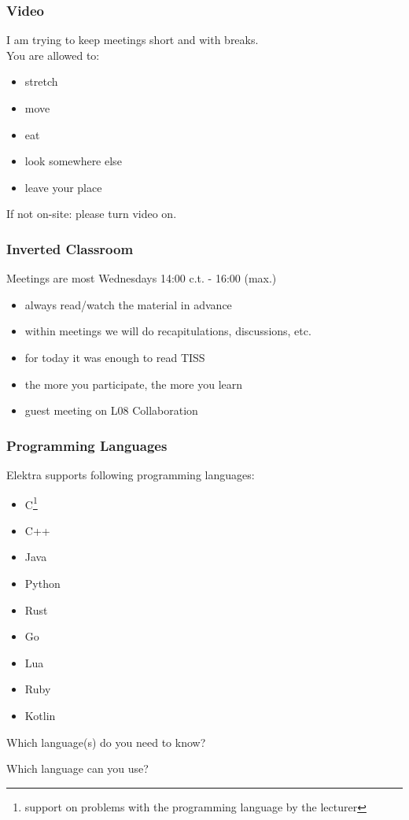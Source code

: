 \begin{assignment}
	\frametitle{Video}
	I am trying to keep meetings short and with breaks. \\
	You are allowed to:
	\begin{itemize}
		\item stretch
		\item move
		\item eat
		\item look somewhere else
		\item leave your place
	\end{itemize}

	\begin{task}
	If not on-site: please turn video on.
	\end{task}
\end{assignment}

\begin{frame}
	\frametitle{Inverted Classroom}
	Meetings are most Wednesdays 14:00 c.t. - 16:00 (max.)

	\begin{itemize}[<+-| alert@+>]
		\item always read/watch the material in advance
		\item within meetings we will do recapitulations, discussions, etc.
		\item for today it was enough to read TISS
		\item the more you participate, the more you learn
		\item guest meeting on L08 Collaboration
	\end{itemize}
\end{frame}

\begin{frame}
	\frametitle{Programming Languages}
	Elektra supports following programming languages:
	\begin{itemize}
		\item C\footnote{support on problems with the programming language by the lecturer}
		\item C++\footnotemark[1]
		\item Java\footnotemark[1]
		\item Python\footnotemark[1]
		\item Rust
		\item Go
		\item Lua
		\item Ruby
		\item Kotlin
	\end{itemize}

	\begin{question}[1]
	Which language(s) do you need to know?
	\end{question}

	\begin{question}[2]
	Which language can you use?
	\end{question}
\end{frame}

